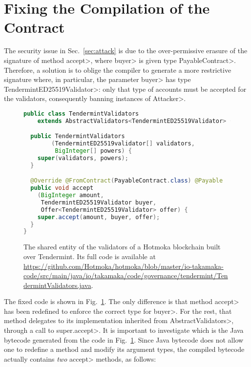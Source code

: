 \section{Fixing the Compilation of the Contract} \label{sec:fix}

The security issue in Sec.~\ref{sec:attack} is due to the
over-permissive erasure of the signature of method \<accept>,
where \<buyer> is given type \<PayableContract>.
Therefore, a solution is to oblige the compiler to generate a more
restrictive signature where, in particular, the parameter \<buyer>
has type \<TendermintED25519Validator>: only that type of accounts
must be accepted for the validators, consequently banning instances of \<Attacker>.

\begin{figure}[t]
  \begin{center}
    \begin{lstlisting}[language=Java]
public class TendermintValidators
    extends AbstractValidators<TendermintED25519Validator> {

  public TendermintValidators
        (TendermintED25519validator[] validators, 
         BigInteger[] powers) {
    super(validators, powers);
  }

  @Override @FromContract(PayableContract.class) @Payable
  public void accept
    (BigInteger amount, 
     TendermintED25519Validator buyer, 
     Offer<TendermintED25519Validator> offer) {
    super.accept(amount, buyer, offer);
  }
}
    \end{lstlisting}
  \end{center}
  \caption{The shared entity of the validators of a Hotmoka blockchain built over Tendermint.
  Its full code is available at \textsf{\url{https://github.com/Hotmoka/hotmoka/blob/master/io-takamaka-code/src/main/java/io/takamaka/code/governance/tendermint/TendermintValidators.java}}.}\label{fig:solution}
\end{figure}

The fixed code is shown in Fig.~\ref{fig:solution}. The only difference is that method
\<accept> has been redefined to enforce the correct type for \<buyer>. For the rest, that method
delegates to its implementation inherited from \<AbstractValidators>, through a call
to \<super.accept>.
It is important to investigate which is the Java bytecode generated from
the code in Fig.~\ref{fig:solution}. Since Java bytecode does not allow one to redefine a method
and modify its argument types, the compiled bytecode actually contains \emph{two}
\<accept> methods, as follows:

